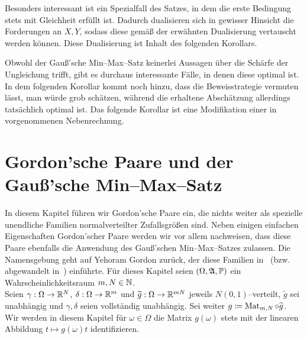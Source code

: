 \documentclass[a4paper]{report}
\numberwithin[\roman]{equation}{sat}
\begin{document}
Besonders interessant ist ein Spezialfall des Satzes, in dem die erste
Bedingung stets mit Gleichheit erfüllt ist. Dadurch dualisieren sich in
gewisser Hinsicht die Forderungen an $X, Y$, sodass diese gemäß der erwähnten
Dualisierung vertauscht werden können. Diese
Dualisierung ist Inhalt des folgenden Korollars.





Obwohl der Gauß'sche Min--Max--Satz keinerlei Aussagen über die Schärfe der
Ungleichung trifft, gibt es durchaus interessante Fälle, in denen diese
optimal ist.
In dem folgenden Korollar kommt noch hinzu, dass die
Beweisstrategie vermuten lässt, man würde grob schätzen, während die erhaltene
Abschätzung allerdings tatsächlich optimal ist.
Das folgende Korollar ist eine
Modifikation einer in~\cite{Gor2} vorgenommenen Nebenrechnung.



\chapter{Gordon'sche Paare und der Gauß'sche Min--Max--Satz}
\label{ch:kapitel3}

In diesem Kapitel führen wir Gordon'sche Paare ein, die nichts
weiter als spezielle unendliche Familien normalverteilter Zufallsgrößen sind.
Neben einigen einfachen Eigenschaften Gordon'scher Paare werden wir vor allem
nachweisen, dass diese Paare ebenfalls die Anwendung des Gauß'schen
Min--Max--Satzes zulassen.
Die Namensgebung geht auf Yehoram Gordon zurück, der
diese Familien in~\cite{Gor} (bzw. abgewandelt in~\cite{Gor2}) einführte.
\parag
Für dieses Kapitel seien $(\Omega, \mathfrak{A}, \mathbb{P})$ ein Wahrscheinlichkeitsraum
$m, N \in \mathbb{N}$.\\
Seien $\gamma: \Omega \rightarrow \mathbb{R}^N$, $\delta: \Omega \rightarrow \mathbb{R}^m$
und $\widetilde g: \Omega \rightarrow \mathbb{R}^{mN}$ jeweils $N(0,1)$--verteilt,
$\widetilde g$ sei unabhängig und $\gamma, \delta$ seien vollständig
unabhängig.
Sei weiter $g\coloneqq  \mathop{\textrm{Mat}}\nolimits_{m,N} \circ \widetilde g$.\\
Wir werden in diesem Kapitel für $\omega \in \Omega$ die Matrix $g(\omega)$
stets mit der linearen Abbildung $t \mapsto g(\omega)t$ identifizieren.


\end{document}
